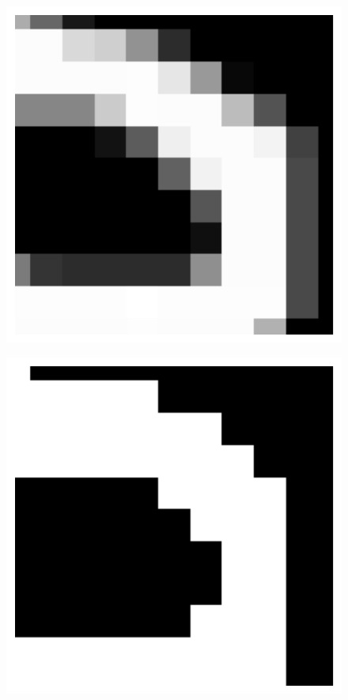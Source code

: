 \begin{figure}[!htb]
    \centering
  \begin{minipage}[b]{.48\linewidth}
      \includegraphics[width=\linewidth]{images/mnist_raw.pdf}
      \label{fig:mnist_dataset_original}
  \end{minipage}
  \begin{minipage}[b]{.48\linewidth}
      \includegraphics[width=\linewidth]{images/mnist_binarized.pdf}

\end{minipage}
\end{figure}
